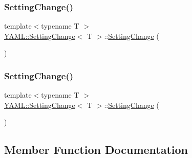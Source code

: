 \subsubsection{\texorpdfstring{SettingChange()}{SettingChange()}\hspace{0.1cm}{\footnotesize\ttfamily [2/3]}}
{\footnotesize\ttfamily template$<$typename T $>$ \\
\mbox{\hyperlink{class_y_a_m_l_1_1_setting_change}{Y\+A\+M\+L\+::\+Setting\+Change}}$<$ T $>$\+::\mbox{\hyperlink{class_y_a_m_l_1_1_setting_change}{Setting\+Change}} (\begin{DoxyParamCaption}\item[{const \mbox{\hyperlink{class_y_a_m_l_1_1_setting_change}{Setting\+Change}}$<$ T $>$ \&}]{ }\end{DoxyParamCaption})\hspace{0.3cm}{\ttfamily [delete]}}

\mbox{\label{class_y_a_m_l_1_1_setting_change_ac80eb138e4e7d2acabc44fe6badc2c24}} 
\subsubsection{\texorpdfstring{SettingChange()}{SettingChange()}\hspace{0.1cm}{\footnotesize\ttfamily [3/3]}}
{\footnotesize\ttfamily template$<$typename T $>$ \\
\mbox{\hyperlink{class_y_a_m_l_1_1_setting_change}{Y\+A\+M\+L\+::\+Setting\+Change}}$<$ T $>$\+::\mbox{\hyperlink{class_y_a_m_l_1_1_setting_change}{Setting\+Change}} (\begin{DoxyParamCaption}\item[{\mbox{\hyperlink{class_y_a_m_l_1_1_setting_change}{Setting\+Change}}$<$ T $>$ \&\&}]{ }\end{DoxyParamCaption})\hspace{0.3cm}{\ttfamily [delete]}}



\subsection{Member Function Documentation}
\mbox{\label{class_y_a_m_l_1_1_setting_change_a8ad492499b6c81fc2d06b6e16f7d0343}} 
